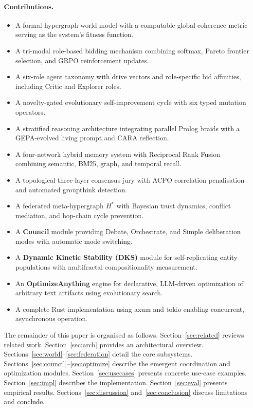 \documentclass[11pt]{article}
\begin{document}
\paragraph{Contributions.}
\begin{itemize}[noitemsep,topsep=4pt]
  \item A formal hypergraph world model with a computable global coherence metric
        serving as the system's fitness function.
  \item A tri-modal role-based bidding mechanism combining softmax, Pareto frontier
        selection, and GRPO reinforcement updates.
  \item A six-role agent taxonomy with drive vectors and role-specific bid
        affinities, including Critic and Explorer roles.
  \item A novelty-gated evolutionary self-improvement cycle with six typed mutation
        operators.
  \item A stratified reasoning architecture integrating parallel Prolog braids with
        a GEPA-evolved living prompt and CARA reflection.
  \item A four-network hybrid memory system with Reciprocal Rank Fusion combining
        semantic, BM25, graph, and temporal recall.
  \item A topological three-layer consensus jury with ACPO correlation penalisation
        and automated groupthink detection.
  \item A federated meta-hypergraph $H^*$ with Bayesian trust dynamics, conflict
        mediation, and hop-chain cycle prevention.
  \item A \textbf{Council} module providing Debate, Orchestrate, and Simple
        deliberation modes with automatic mode switching.
  \item A \textbf{Dynamic Kinetic Stability (DKS)} module for self-replicating
        entity populations with multifractal compositionality measurement.
  \item An \textbf{OptimizeAnything} engine for declarative, LLM-driven
        optimization of arbitrary text artifacts using evolutionary search.
  \item A complete Rust implementation using axum and tokio enabling concurrent,
        asynchronous operation.
\end{itemize}

The remainder of this paper is organised as follows.
Section~\ref{sec:related} reviews related work.
Section~\ref{sec:arch} provides an architectural overview.
Sections~\ref{sec:world}--\ref{sec:federation} detail the core subsystems.
Sections~\ref{sec:council}--\ref{sec:optimize} describe the emergent coordination
and optimization modules.
Section~\ref{sec:usecases} presents concrete use-case examples.
Section~\ref{sec:impl} describes the implementation.
Section~\ref{sec:eval} presents empirical results.
Sections~\ref{sec:discussion} and~\ref{sec:conclusion} discuss limitations and
conclude.
\end{document}
